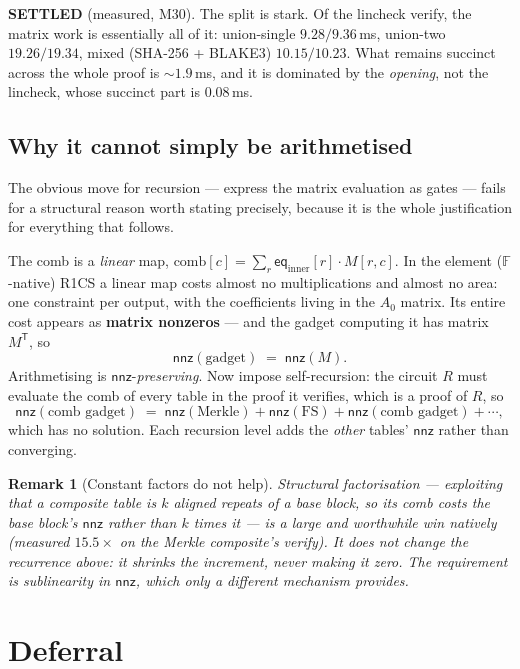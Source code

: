 \documentclass[11pt]{article}
\newcommand{\F}{\mathbb{F}}
\newcommand{\eq}{\mathsf{eq}}
\newcommand{\nnz}{\mathsf{nnz}}
\newcommand{\settled}[1]{\medskip\noindent\textbf{SETTLED} (#1).\xspace}
\newtheorem{remark}{Remark}
\theoremstyle{definition}
\begin{document}
\settled{measured, M30} The split is stark. Of the lincheck verify, the
matrix work is essentially all of it: union-single $9.28/9.36$\,ms,
union-two $19.26/19.34$, mixed (SHA-256 + BLAKE3) $10.15/10.23$. What
remains succinct across the whole proof is ${\sim}1.9$\,ms, and it is
dominated by the \emph{opening}, not the lincheck, whose succinct part is
$0.08$\,ms.

\subsection{Why it cannot simply be arithmetised}\label{sec:nnzpreserving}

The obvious move for recursion --- express the matrix evaluation as gates
--- fails for a structural reason worth stating precisely, because it is the
whole justification for everything that follows.

The comb is a \emph{linear} map, $\text{comb}[c] = \sum_r
\eq_{\text{inner}}[r]\cdot M[r,c]$. In the element ($\F$-native) R1CS a
linear map costs almost no multiplications and almost no area: one
constraint per output, with the coefficients living in the $A_0$ matrix. Its
entire cost appears as \textbf{matrix nonzeros} --- and the gadget computing
it has matrix $M^{\mathsf T}$, so
\[
  \nnz(\text{gadget}) \;=\; \nnz(M).
\]
Arithmetising is $\nnz$-\emph{preserving}. Now impose self-recursion: the
circuit $R$ must evaluate the comb of every table in the proof it verifies,
which is a proof of $R$, so
\[
  \nnz(\text{comb gadget}) \;=\;
  \nnz(\text{Merkle}) + \nnz(\text{FS}) + \nnz(\text{comb gadget}) + \cdots,
\]
which has no solution. Each recursion level adds the \emph{other} tables'
$\nnz$ rather than converging.

\begin{remark}[Constant factors do not help]
Structural factorisation --- exploiting that a composite table is $k$
aligned repeats of a base block, so its comb costs the base block's $\nnz$
rather than $k$ times it --- is a large and worthwhile win natively
(measured $15.5\times$ on the Merkle composite's verify). It does not change
the recurrence above: it shrinks the increment, never making it zero. The
requirement is \emph{sublinearity} in $\nnz$, which only a different
mechanism provides.
\end{remark}

\section{Deferral}\label{sec:defer}
\end{document}
